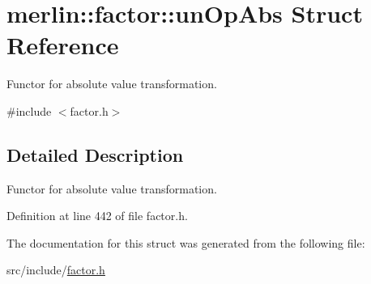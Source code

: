 \hypertarget{structmerlin_1_1factor_1_1unOpAbs}{}\section{merlin\+:\+:factor\+:\+:un\+Op\+Abs Struct Reference}
\label{structmerlin_1_1factor_1_1unOpAbs}


Functor for absolute value transformation.  




{\ttfamily \#include $<$factor.\+h$>$}



\subsection{Detailed Description}
Functor for absolute value transformation. 

Definition at line 442 of file factor.\+h.



The documentation for this struct was generated from the following file\+:\begin{DoxyCompactItemize}
\item 
src/include/\hyperlink{factor_8h}{factor.\+h}\end{DoxyCompactItemize}

